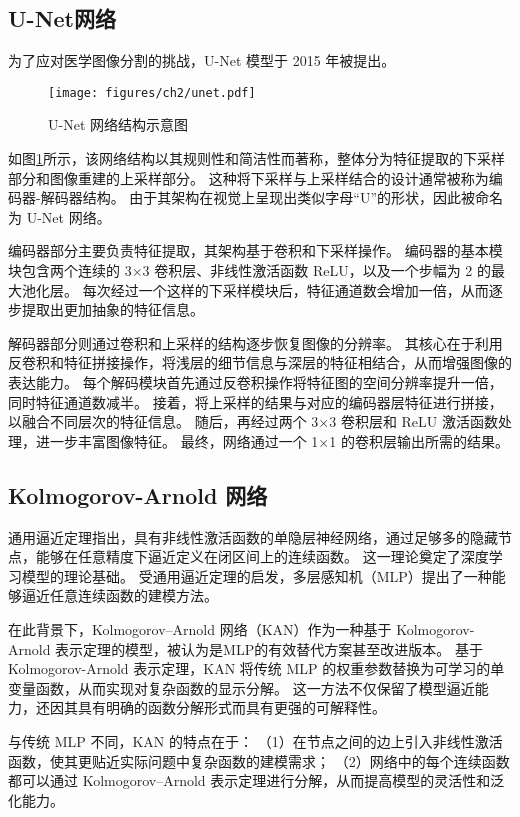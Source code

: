 \subsection{U-Net网络}
为了应对医学图像分割的挑战，U-Net 模型\cite{unet}于 2015 年被提出。
\begin{figure}
    \centering
    \texttt{[image: figures/ch2/unet.pdf]}
    \caption{U-Net 网络结构示意图}
    \label{img:unet}
\end{figure}

如图\ref{img:unet}所示，该网络结构以其规则性和简洁性而著称，整体分为特征提取的下采样部分和图像重建的上采样部分。
这种将下采样与上采样结合的设计通常被称为编码器-解码器结构。
由于其架构在视觉上呈现出类似字母“U”的形状，因此被命名为 U-Net 网络。

编码器部分主要负责特征提取，其架构基于卷积和下采样操作。
编码器的基本模块包含两个连续的 3×3 卷积层、非线性激活函数 ReLU，以及一个步幅为 2 的最大池化层。
每次经过一个这样的下采样模块后，特征通道数会增加一倍，从而逐步提取出更加抽象的特征信息。

解码器部分则通过卷积和上采样的结构逐步恢复图像的分辨率。
其核心在于利用反卷积和特征拼接操作，将浅层的细节信息与深层的特征相结合，从而增强图像的表达能力。
每个解码模块首先通过反卷积操作将特征图的空间分辨率提升一倍，同时特征通道数减半。
接着，将上采样的结果与对应的编码器层特征进行拼接，以融合不同层次的特征信息。
随后，再经过两个 3×3 卷积层和 ReLU 激活函数处理，进一步丰富图像特征。
最终，网络通过一个 1×1 的卷积层输出所需的结果。

\subsection{Kolmogorov-Arnold 网络}
通用逼近定理\cite{universal_approximation}指出，具有非线性激活函数的单隐层神经网络，通过足够多的隐藏节点，能够在任意精度下逼近定义在闭区间上的连续函数。
这一理论奠定了深度学习模型的理论基础。
受通用逼近定理的启发，多层感知机（MLP）\cite{mlp}提出了一种能够逼近任意连续函数的建模方法。

在此背景下，Kolmogorov–Arnold 网络（KAN）\cite{kan}作为一种基于 Kolmogorov-Arnold 表示定理\cite{kan_theorem}的模型，被认为是MLP的有效替代方案甚至改进版本。
基于Kolmogorov-Arnold 表示定理，KAN 将传统 MLP 的权重参数替换为可学习的单变量函数，从而实现对复杂函数的显示分解。
这一方法不仅保留了模型逼近能力，还因其具有明确的函数分解形式而具有更强的可解释性。

与传统 MLP 不同，KAN 的特点在于：
（1）在节点之间的边上引入非线性激活函数，使其更贴近实际问题中复杂函数的建模需求；
（2）网络中的每个连续函数都可以通过 Kolmogorov–Arnold 表示定理进行分解，从而提高模型的灵活性和泛化能力。

